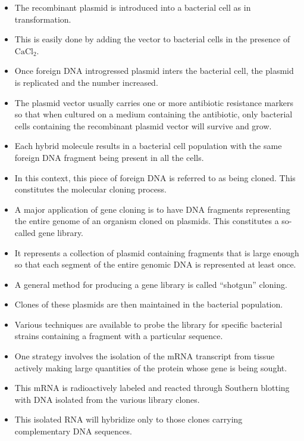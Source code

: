 \documentclass[11pt,dvipsnames,ignorenonframetext,aspectratio=169]{beamer}
\providecommand{\tightlist}{%
  \setlength{\itemsep}{0pt}\setlength{\parskip}{0pt}}
\begin{document}
\begin{frame}{}
\protect\hypertarget{section-25}{}

\begin{itemize}
\tightlist
\item
  The recombinant plasmid is introduced into a bacterial cell as in
  transformation.
\item
  This is easily done by adding the vector to bacterial cells in the
  presence of \(\mathrm{CaCl_2}\).
\item
  Once foreign DNA introgressed plasmid inters the bacterial cell, the
  plasmid is replicated and the number increased.
\item
  The plasmid vector usually carries one or more antibiotic resistance
  markers so that when cultured on a medium containing the antibiotic,
  only bacterial cells containing the recombinant plasmid vector will
  survive and grow.
\item
  Each hybrid molecule results in a bacterial cell population with the
  same foreign DNA fragment being present in all the cells.
\item
  In this context, this piece of foreign DNA is referred to as being
  cloned. This constitutes the molecular cloning process.
\end{itemize}

\end{frame}

\begin{frame}{}
\protect\hypertarget{section-26}{}

\begin{itemize}
\tightlist
\item
  A major application of gene cloning is to have DNA fragments
  representing the entire genome of an organism cloned on plasmids. This
  constitutes a so-called gene library.
\item
  It represents a collection of plasmid containing fragments that is
  large enough so that each segment of the entire genomic DNA is
  represented at least once.
\item
  A general method for producing a gene library is called ``shotgun''
  cloning.
\item
  Clones of these plasmids are then maintained in the bacterial
  population.
\item
  Various techniques are available to probe the library for specific
  bacterial strains containing a fragment with a particular sequence.
\item
  One strategy involves the isolation of the mRNA transcript from tissue
  actively making large quantities of the protein whose gene is being
  sought.
\item
  This mRNA is radioactively labeled and reacted through Southern
  blotting with DNA isolated from the various library clones.
\item
  This isolated RNA will hybridize only to those clones carrying
  complementary DNA sequences.
\end{itemize}

\end{frame}
\end{document}
